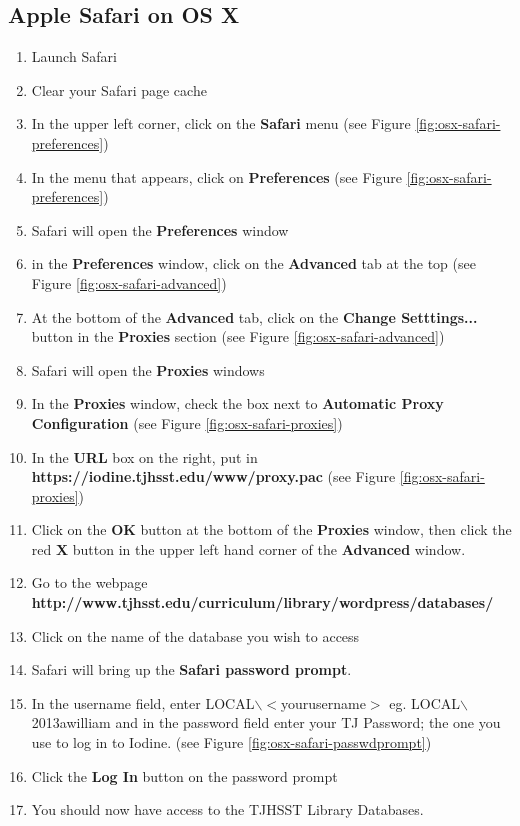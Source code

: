 \documentclass{article}
\newcommand{\proxypacurl}{https://iodine.tjhsst.edu/www/proxy.pac}
\newcommand{\librarydbpage}{http://www.tjhsst.edu/curriculum/library/wordpress/databases/}
\begin{document}
\begin{flushleft}
\section{Apple Safari on OS X}
\begin{enumerate}
\item Launch Safari
\item Clear your Safari page cache
\item In the upper left corner, click on the \textbf{Safari} menu (see Figure \ref{fig:osx-safari-preferences})
\item In the menu that appears, click on \textbf{Preferences} (see Figure \ref{fig:osx-safari-preferences})
\item Safari will open the \textbf{Preferences} window
\item in the \textbf{Preferences} window, click on the \textbf{Advanced} tab at the top (see Figure \ref{fig:osx-safari-advanced})
\item At the bottom of the \textbf{Advanced} tab, click on the \textbf{Change Setttings...} button in the \textbf{Proxies} section (see Figure \ref{fig:osx-safari-advanced})
\item Safari will open the \textbf{Proxies} windows
\item In the \textbf{Proxies} window, check the box next to \textbf{Automatic Proxy Configuration} (see Figure \ref{fig:osx-safari-proxies})
\item In the \textbf{URL} box on the right, put in \linebreak\textbf{\proxypacurl} (see Figure \ref{fig:osx-safari-proxies})
\item Click on the \textbf{OK} button at the bottom of the \textbf{Proxies} window, then click the red \textbf{X} button in the upper left hand corner of the \textbf{Advanced} window.
\item Go to the webpage \textbf{\librarydbpage}
\item Click on the name of the database you wish to access
\item Safari will bring up the \textbf{Safari password prompt}.
\item In the username field, enter LOCAL$\backslash$$<$yourusername$>$ eg. LOCAL$\backslash$2013awilliam and in the password field enter your TJ Password; the one you use to log in to Iodine. (see Figure \ref{fig:osx-safari-passwdprompt})
\item Click the \textbf{Log In} button on the password prompt
\item You should now have access to the TJHSST Library Databases.
$$
\end{enumerate}
\end{flushleft}
\end{document}
